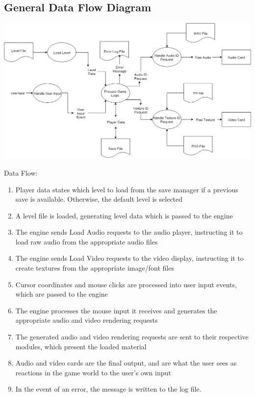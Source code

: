 \documentclass{article}
\begin{document}
	\subsection{General Data Flow Diagram}
		\begin{center}
			\includegraphics[scale=0.45]{DataFlow}
		\end{center}
		Data Flow:
		\begin{enumerate}
      \item Player data states which level to load from the save manager if a previous save is available. Otherwise, the default level is selected
			\item A level file is loaded, generating level data which is passed to the engine
			\item The engine sends Load Audio requests to the audio player, instructing it to load raw audio from the appropriate audio files
			\item The engine sends Load Video requests to the video display, instructing it to create textures from the appropriate image/font files
			\item Cursor coordinates and mouse clicks are processed into user input events, which are passed to the engine
			\item The engine processes the mouse input it receives and generates the appropriate audio and video rendering requests
      \item The generated audio and video rendering requests are sent to their respective modules, which present the loaded material
			\item Audio and video cards are the final output, and are what the user sees as reactions in the game world to the user's own input
      \item In the event of an error, the message is written to the log file.
		\end{enumerate}
\end{document}
